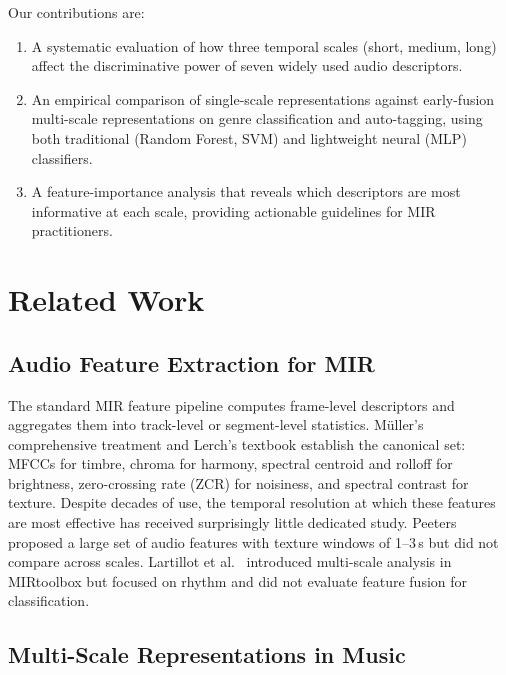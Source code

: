 \documentclass[conference]{IEEEtran}
\begin{document}
Our contributions are:
\begin{enumerate}
    \item A systematic evaluation of how three temporal scales (short, medium, long) affect the discriminative power of seven widely used audio descriptors.
    \item An empirical comparison of single-scale representations against early-fusion multi-scale representations on genre classification and auto-tagging, using both traditional (Random Forest, SVM) and lightweight neural (MLP) classifiers.
    \item A feature-importance analysis that reveals which descriptors are most informative at each scale, providing actionable guidelines for MIR practitioners.
\end{enumerate}

\section{Related Work}

\subsection{Audio Feature Extraction for MIR}

The standard MIR feature pipeline computes frame-level descriptors and aggregates them into track-level or segment-level statistics.
M\"uller's comprehensive treatment \cite{muller2015fundamentals} and Lerch's textbook \cite{lerch2012introduction} establish the canonical set: MFCCs for timbre, chroma for harmony, spectral centroid and rolloff for brightness, zero-crossing rate (ZCR) for noisiness, and spectral contrast for texture.
Despite decades of use, the temporal resolution at which these features are most effective has received surprisingly little dedicated study.
Peeters \cite{peeters2004large} proposed a large set of audio features with texture windows of 1--3\,s but did not compare across scales.
Lartillot et al.\ \cite{lartillot2008multi} introduced multi-scale analysis in MIRtoolbox but focused on rhythm and did not evaluate feature fusion for classification.

\subsection{Multi-Scale Representations in Music}
\end{document}
